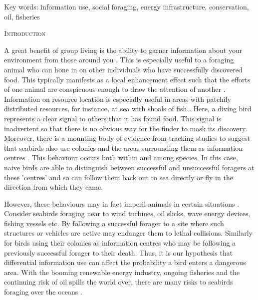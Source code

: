 \documentclass[12pt,letterpaper]{article}
\renewcommand{\section}[1]{%
\bigskip
\begin{center}
\begin{Large}
\normalfont\scshape #1
\medskip
\end{Large}
\end{center}}
\begin{document}
\noindent Key words: information use, social foraging, energy infrastructure, conservation, oil, fisheries\\


\vspace{1.5in}

%
%
\newpage 
\section{Introduction}
A great benefit of group living is the ability to garner information about your environment from those around you \cite{dall2005information}. This is especially useful to a foraging animal who can hone in on other individuals who have successfully discovered food. This typically manifests as a local enhancement effect such that the efforts of one animal are conspicuous enough to draw the attention of another \cite{KaneVul,buckley1997spatial}. Information on resource location is especially useful in areas with patchily distributed resources, for instance, at sea with shoals of fish \cite{thompson2001long}. Here, a diving bird represents a clear signal to others that it has found food. This signal is inadvertent so that there is no obvious way for the finder to mask its discovery. Moreover, there is a mounting body of evidence from tracking studies to suggest that seabirds also use colonies and the areas surrounding them as information centres \cite{ward1973importance, burger1997arrival, weimerskirch2010use,wakefield2013space}. This behaviour occurs both within and among species. In this case, naive birds are able to distinguish between successful and unsuccessful foragers at these 'centres' and so can follow them back out to sea directly or fly in the direction from which they came. 

However, these behaviours may in fact imperil animals in certain situations \cite{giraldeau2002potential}. Consider seabirds foraging near to wind turbines, oil slicks, wave energy devices, fishing vessels etc. By following a successful forager to a site where such structures or vehicles are active may endanger them to lethal collisions. Similarly for birds using their colonies as information centres who may be following a previously successful forager to their death. Thus, it is our hypothesis that differential information use can affect the probability a bird enters a dangerous area. With the booming renewable energy industry, ongoing fisheries and the continuing risk of oil spills the world over, there are many risks to seabirds foraging over the oceans \cite{furness2013assessing,williams1995method}.  
\end{document}
